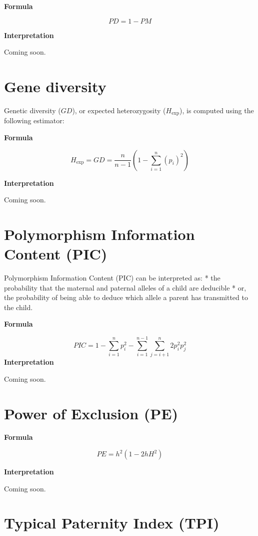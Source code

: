 \documentclass[
  a5paper]{book}
\begin{document}
\textbf{Formula}

\[
PD = 1 - PM
\]

\textbf{Interpretation}

Coming soon.

\hypertarget{gene-diversity}{%
\section{Gene diversity}\label{gene-diversity}}

Genetic diversity (\(GD\)), or expected heterozygosity (\(H_{\mathrm{exp}}\)), is
computed using the following estimator:

\textbf{Formula}

\[
  H_{\mathrm{exp}} = GD = \frac{n}{n - 1} \left( 1 - \sum_{i=1}^{n}(p_i)^2 \right)
\]

\textbf{Interpretation}

Coming soon.

\hypertarget{polymorphism-information-content-pic}{%
\section{Polymorphism Information Content (PIC)}\label{polymorphism-information-content-pic}}

Polymorphism Information Content (PIC) can be interpreted as:
* the probability that the maternal and paternal alleles of a child are
deducible
* or, the probability of being able to deduce which allele a
parent has transmitted to the child.

\textbf{Formula}

\[
PIC = 1 - \sum_{i=1}^{n} p_i^2 - \sum_{i=1}^{n-1} \sum_{j=i+1}^{n} 2p_i^2p_j^2
\]
\textbf{Interpretation}

Coming soon.

\hypertarget{power-of-exclusion-pe}{%
\section{Power of Exclusion (PE)}\label{power-of-exclusion-pe}}

\textbf{Formula}

\[
PE = h^2\left(1 - 2hH^2\right)
\]

\textbf{Interpretation}

Coming soon.

\hypertarget{typical-paternity-index-tpi}{%
\section{Typical Paternity Index (TPI)}\label{typical-paternity-index-tpi}}
\end{document}
